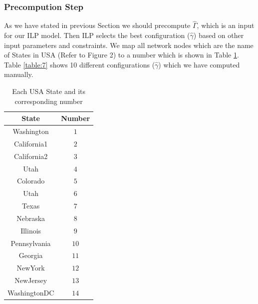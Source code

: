 \documentclass[12pt]{article}
\begin{document}
\subsubsection{Precompution Step}
As we have stated in previous Section we should precompute $\hat{\Gamma}$, which is an input for our ILP model. Then ILP selects the best configuration ($\hat{\gamma}$) based on other input parameters and constraints. We map all network nodes which are the name of States in USA (Refer to Figure 2) to a number which is shown in Table \ref{table:6}. Table \ref{table:7} shows 10 different configurations ($\hat{\gamma}$) which we have computed manually.
\begin{table}[t!]
\centering
\begin{tabular}{|c c|} 
 \hline
 State & Number \\ [0.5ex] 
 \hline 
 Washington&$1$\\ 
 California1&$2$ \\
 California2&$3$ \\
 Utah&$4$ \\
 Colorado&$5$ \\
 Utah&$6$ \\
 Texas&$7$ \\
 Nebraska&$8$ \\
 Illinois&$9$ \\
 Pennsylvania&$10$ \\
 Georgia&$11$ \\
 NewYork&$12$ \\
 NewJersey& $13$\\
 WashingtonDC&$14$\\[1ex] 
 \hline
\end{tabular}
\caption{Each USA State and its corresponding number}
\label{table:6}
\end{table}
\end{document}
